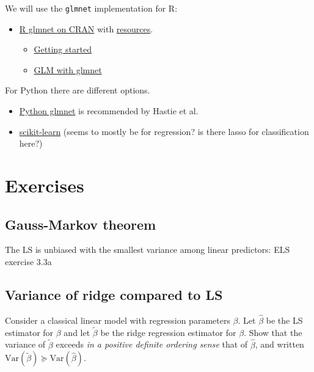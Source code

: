 \documentclass[
  letterpaper,
  DIV=11,
  numbers=noendperiod]{scrartcl}
\providecommand{\tightlist}{%
  \setlength{\itemsep}{0pt}\setlength{\parskip}{0pt}}\usepackage{longtable,booktabs,array}
\begin{document}
We will use the \texttt{glmnet} implementation for R:

\begin{itemize}
\tightlist
\item
  \href{https://cran.r-project.org/web/packages/glmnet/index.html}{R
  glmnet on CRAN} with
  \href{http://www.stanford.edu/~hastie/glmnet}{resources}.

  \begin{itemize}
  \tightlist
  \item
    \href{https://glmnet.stanford.edu/articles/glmnet.html}{Getting
    started}
  \item
    \href{https://glmnet.stanford.edu/articles/glmnetFamily.html}{GLM
    with glmnet}
  \end{itemize}
\end{itemize}

For Python there are different options.

\begin{itemize}
\tightlist
\item
  \href{https://web.stanford.edu/~hastie/glmnet_python/}{Python glmnet}
  is recommended by Hastie et al.
\item
  \href{https://scikit-learn.org/stable/modules/linear_model.html\#ridge-regression-and-classification}{scikit-learn}
  (seems to mostly be for regression? is there lasso for classification
  here?)
\end{itemize}

\hypertarget{exercises}{%
\section{Exercises}\label{exercises}}

\hypertarget{gauss-markov-theorem}{%
\subsection{Gauss-Markov theorem}\label{gauss-markov-theorem}}

The LS is unbiased with the smallest variance among linear predictors:
ELS exercise 3.3a

\hypertarget{variance-of-ridge-compared-to-ls}{%
\subsection{Variance of ridge compared to
LS}\label{variance-of-ridge-compared-to-ls}}

Consider a classical linear model with regression parameters \(\beta\).
Let \(\hat{\beta}\) be the LS estimator for \(\beta\) and let
\(\tilde{\beta}\) be the ridge regression estimator for \(\beta\). Show
that the variance of \(\tilde{\beta}\) exceeds \emph{in a positive
definite ordering sense} that of \(\hat{\beta}\), and written
\(\text{Var}(\tilde{\beta}) \succeq \text{Var}(\hat{\beta})\).
\end{document}
